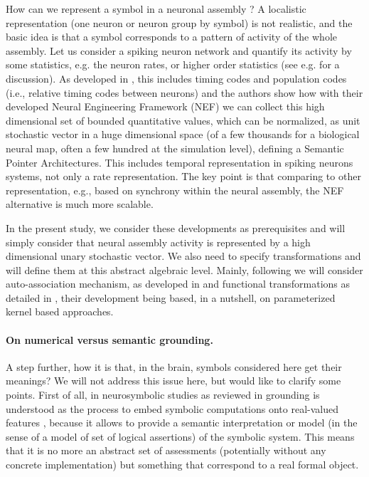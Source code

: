 \documentclass[a4]{article}
\begin{document}
How can we represent a symbol in a neuronal assembly ? A localistic representation (one neuron or neuron group by symbol) is not realistic, and the basic idea is that a symbol corresponds to a pattern of activity of the whole assembly. Let us consider a spiking neuron network and quantify its activity by some statistics, e.g. the neuron rates, or higher order statistics (see e.g. \cite{cessac_dynamics_2008} for a discussion). As developed in \cite{eliasmith_neural_2002}, this includes timing codes and population codes (i.e., relative timing codes between neurons) and the authors show how with their developed Neural Engineering Framework (NEF) we can collect this high dimensional set of bounded quantitative values, which can be normalized, as unit stochastic vector in a huge dimensional space (of a few thousands for a biological neural map, often a few hundred at the simulation level), defining a Semantic Pointer Architectures. This includes temporal representation in spiking neurons systems, not only a rate representation. The key point is that comparing to other representation, e.g., based on synchrony within the neural assembly, the NEF alternative is much more scalable.

In the present study, we consider these developments as prerequisites and will simply consider that neural assembly activity is represented by a high dimensional unary stochastic vector. We also need to specify transformations and will define them at this abstract algebraic level. Mainly, following \cite{mercier_ontology_2021} we will consider auto-association mechanism, as developed in \cite{stewart_biologically_2011} and functional transformations as detailed in \cite{eliasmith_neural_2002}, their development being based, in a nutshell, on parameterized kernel based approaches.

\paragraph{On numerical versus semantic grounding.} 

A step further, how it is that, in the brain, symbols considered here get their meanings? We will not address this issue here, but would like to clarify some points. First of all, in neurosymbolic studies as reviewed in \cite{garcez_neurosymbolic_2020} grounding is understood as the process to embed symbolic computations onto real-valued features \cite{badreddine_logic_2021}, because it allows to provide a semantic interpretation or model (in the sense of a model of set of logical assertions) of the symbolic system. This means that it is no more an abstract set of assessments (potentially without any concrete implementation) but something that correspond to a real formal object.
\end{document}
